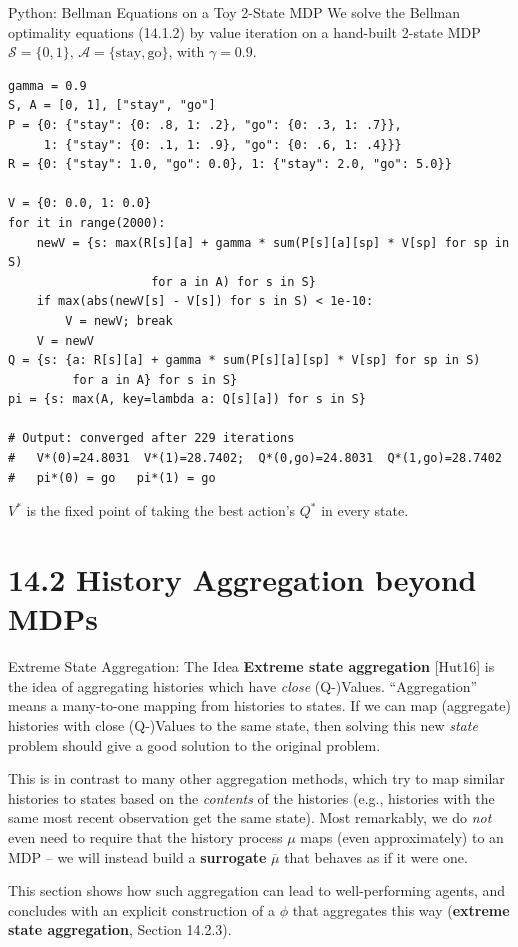 \documentclass[aspectratio=169,10pt]{beamer}
\newcommand{\Sc}{\mathcal{S}}
\newcommand{\Ac}{\mathcal{A}}
\begin{document}
\begin{frame}[fragile]{Python: Bellman Equations on a Toy 2-State MDP}
  We solve the Bellman optimality equations (14.1.2) by value iteration on
  a hand-built 2-state MDP $\Sc=\{0,1\}$, $\Ac=\{\text{stay},\text{go}\}$,
  with $\gamma=0.9$.
  \begin{lstlisting}[style=pycode]
gamma = 0.9
S, A = [0, 1], ["stay", "go"]
P = {0: {"stay": {0: .8, 1: .2}, "go": {0: .3, 1: .7}},
     1: {"stay": {0: .1, 1: .9}, "go": {0: .6, 1: .4}}}
R = {0: {"stay": 1.0, "go": 0.0}, 1: {"stay": 2.0, "go": 5.0}}

V = {0: 0.0, 1: 0.0}
for it in range(2000):
    newV = {s: max(R[s][a] + gamma * sum(P[s][a][sp] * V[sp] for sp in S)
                    for a in A) for s in S}
    if max(abs(newV[s] - V[s]) for s in S) < 1e-10:
        V = newV; break
    V = newV
Q = {s: {a: R[s][a] + gamma * sum(P[s][a][sp] * V[sp] for sp in S)
         for a in A} for s in S}
pi = {s: max(A, key=lambda a: Q[s][a]) for s in S}

# Output: converged after 229 iterations
#   V*(0)=24.8031  V*(1)=28.7402;  Q*(0,go)=24.8031  Q*(1,go)=28.7402
#   pi*(0) = go   pi*(1) = go
  \end{lstlisting}
  $V^*$ is the fixed point of taking the best action's $Q^*$ in every state.
\end{frame}

\section{14.2 History Aggregation beyond MDPs}

\begin{frame}{Extreme State Aggregation: The Idea}
  \textbf{Extreme state aggregation} [Hut16] is the idea of aggregating
  histories which have \emph{close} (Q-)Values. ``Aggregation'' means a
  many-to-one mapping from histories to states. If we can map (aggregate)
  histories with close (Q-)Values to the same state, then solving this new
  \emph{state} problem should give a good solution to the original
  problem.

  \vspace{0.4em}
  This is in contrast to many other aggregation methods, which try to map
  similar histories to states based on the \emph{contents} of the
  histories (e.g., histories with the same most recent observation get the
  same state). Most remarkably, we do \emph{not} even need to require that
  the history process $\mu$ maps (even approximately) to an MDP -- we will
  instead build a \textbf{surrogate} $\overline\mu$ that behaves as if it
  were one.

  \vspace{0.4em}
  This section shows how such aggregation can lead to well-performing
  agents, and concludes with an explicit construction of a $\phi$ that
  aggregates this way (\textbf{extreme state aggregation}, Section
  14.2.3).
\end{frame}
\end{document}
